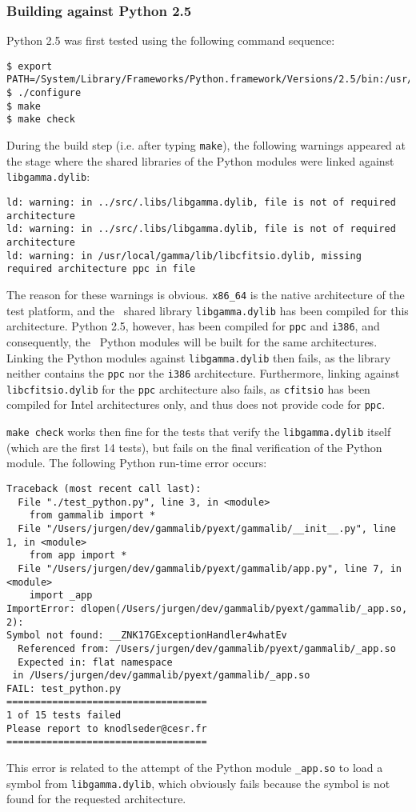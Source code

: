 \documentclass{article}[12pt,a4]
\begin{document}
\subsubsection{Building against Python 2.5}

Python 2.5 was first tested using the following command sequence:
{\small\begin{verbatim}
$ export PATH=/System/Library/Frameworks/Python.framework/Versions/2.5/bin:/usr/bin:/bin:/usr/sbin:/sbin
$ ./configure
$ make
$ make check
\end{verbatim}}

During the build step (i.e. after typing {\tt make}), the following warnings appeared at the stage
where the shared libraries of the Python modules were linked against {\tt libgamma.dylib}:
{\small\begin{verbatim}
ld: warning: in ../src/.libs/libgamma.dylib, file is not of required architecture
ld: warning: in ../src/.libs/libgamma.dylib, file is not of required architecture
ld: warning: in /usr/local/gamma/lib/libcfitsio.dylib, missing required architecture ppc in file
\end{verbatim}}
The reason for these warnings is obvious.
{\tt x86\_64} is the native architecture of the test platform, and the \this\ shared library
{\tt libgamma.dylib} has been compiled for this architecture.
Python 2.5, however, has been compiled for {\tt ppc} and {\tt i386}, and consequently,
the \this\ Python modules will be built for the same architectures.
Linking the Python modules against {\tt libgamma.dylib} then fails, as the library neither
contains the {\tt ppc} nor the {\tt i386} architecture.
Furthermore, linking against {\tt libcfitsio.dylib} for the {\tt ppc} architecture also fails,
as {\tt cfitsio} has been compiled for Intel architectures only, and thus does not provide
code for {\tt ppc}.

{\tt make check} works then fine for the tests that verify the {\tt libgamma.dylib} itself (which
are the first 14 tests), but fails on the final verification of the Python module.
The following Python run-time error occurs:
{\small\begin{verbatim}
Traceback (most recent call last):
  File "./test_python.py", line 3, in <module>
    from gammalib import *
  File "/Users/jurgen/dev/gammalib/pyext/gammalib/__init__.py", line 1, in <module>
    from app import *
  File "/Users/jurgen/dev/gammalib/pyext/gammalib/app.py", line 7, in <module>
    import _app
ImportError: dlopen(/Users/jurgen/dev/gammalib/pyext/gammalib/_app.so, 2): 
Symbol not found: __ZNK17GExceptionHandler4whatEv
  Referenced from: /Users/jurgen/dev/gammalib/pyext/gammalib/_app.so
  Expected in: flat namespace
 in /Users/jurgen/dev/gammalib/pyext/gammalib/_app.so
FAIL: test_python.py
===================================
1 of 15 tests failed
Please report to knodlseder@cesr.fr
===================================
\end{verbatim}}
This error is related to the attempt of the Python module {\tt \_app.so} to load
a symbol from {\tt libgamma.dylib}, which obviously fails because the symbol is
not found for the requested architecture.
\end{document}
